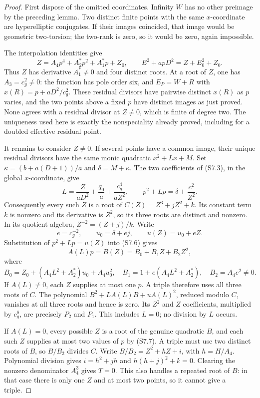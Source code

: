 \begin{proof}
First dispose of the omitted coordinates. Infinity $W$ has no other
preimage by the preceding lemma. Two distinct finite points with the
same $x$-coordinate are hyperelliptic conjugates. If their images
coincided, that image would be geometric two-torsion; the two-rank is
zero, so it would be zero, again impossible.

The interpolation identities give
\[
 Z=A_4p^4+A_2^*p^2+A_1^*p+Z_0,
 \qquad E^2+apD^2=Z+E_0^2+Z_0.                    \tag{S7.6}
\]
Thus $Z$ has derivative $A_1^*\ne0$ and four distinct roots. At a
root of $Z$, one has $A_3=c_g^2\ne0$: the function has pole order
six, and $E_P=W+R$ with
$x(R)=p+aD^2/c_g^2$. These residual divisors have pairwise distinct
$x(R)$ as $p$ varies, and the two points above a fixed $p$ have
distinct images as just proved. None agrees with a residual divisor
at $Z\ne0$, which is finite of degree two. The uniqueness used here
is exactly the nonspeciality already proved, including for a doubled
effective residual point.

It remains to consider $Z\ne0$. If several points have a common
image, their unique residual divisors have the same monic quadratic
$x^2+Lx+M$. Set $\kappa=(b+a(D+1))/a$ and
$\delta=M+\kappa$. The two coefficients of (S7.3), in the global
$x$-coordinate, give
\[
 L=\frac{Z}{aD^2}+\frac{q_0}{a}+\frac{c_g^4}{aZ^2},\qquad
 p^2+Lp=\delta+\frac{c^2}{Z^2}.                  \tag{S7.7}
\]
Consequently every such $Z$ is a root of
$C(Z)=Z^3+jZ^2+k$. Its constant term $k$ is nonzero and its
derivative is $Z^2$, so its three roots are distinct and nonzero.
In its quotient algebra,
$Z^{-2}=(Z+j)/k$. Write
\[
 e=c_g^{-2},\qquad u_0=\delta+ej,
 \qquad u(Z)=u_0+eZ.
\]
Substitution of $p^2+Lp=u(Z)$ into (S7.6) gives
\[
 A(L)p=B(Z)=B_0+B_1Z+B_2Z^2,                    \tag{S7.8}
\]
where
\[
 B_0=Z_0+(A_4L^2+A_2^*)u_0+A_4u_0^2,\quad
 B_1=1+e(A_4L^2+A_2^*),\quad B_2=A_4e^2\ne0.
\]
If $A(L)\ne0$, each $Z$ supplies at most one $p$. A triple
therefore uses all three roots of $C$. The polynomial
$B^2+LA(L)B+uA(L)^2$, reduced modulo $C$, vanishes at all three
roots and hence is zero. Its $Z^2$ and $Z$ coefficients, multiplied
by $c_g^8$, are precisely $P_2$ and $P_1$. This includes $L=0$;
no division by $L$ occurs.

If $A(L)=0$, every possible $Z$ is a root of the genuine quadratic
$B$, and each such $Z$ supplies at most two values of $p$ by (S7.7).
A triple must use two distinct roots of $B$, so $B/B_2$ divides $C$.
Write $B/B_2=Z^2+hZ+i$, with $h=H/A_4$. Polynomial division gives
$i=h^2+jh$ and $h(h+j)^2+k=0$. Clearing the nonzero denominator
$A_4^3$ gives $T=0$. This also handles a repeated root of $B$:
in that case there is only one $Z$ and at most two points, so it
cannot give a triple.
\end{proof}

